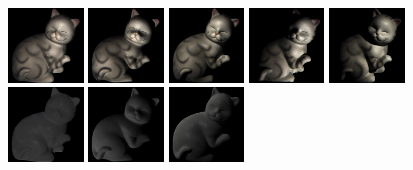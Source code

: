 \includegraphics[width=0.150\textwidth]{ch-psfcn/images/Method/Cat_Normalized/4.0_004.png}
\includegraphics[width=0.150\textwidth]{ch-psfcn/images/Method/Cat_Normalized/4.0_041.png}
\includegraphics[width=0.150\textwidth]{ch-psfcn/images/Method/Cat_Normalized/4.0_048.png}
\includegraphics[width=0.150\textwidth]{ch-psfcn/images/Method/Cat_Normalized/4.0_089.png}
\includegraphics[width=0.150\textwidth]{ch-psfcn/images/Method/Cat_Normalized/4.0_096.png}
\\
\includegraphics[width=0.150\textwidth]{ch-psfcn/images/Method/Cat_Normalized/4.0_1_2_3.png}
\includegraphics[width=0.150\textwidth]{ch-psfcn/images/Method/Cat_Normalized/4.0_1_2_40.png}
\includegraphics[width=0.150\textwidth]{ch-psfcn/images/Method/Cat_Normalized/4.0_1_2_47.png}
